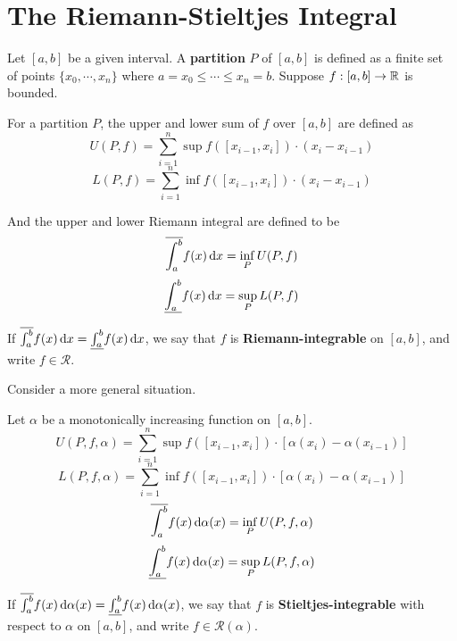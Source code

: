 \section{The Riemann-Stieltjes Integral}
    \begin{defi}
        Let $[a,b]$ be a given interval. A \textbf{partition} $P$ of $[a,b]$ is defined as a finite set of points $\{ x_0, \cdots, x_n \}$ where $a = x_0 \leq \cdots \leq x_n = b$. Suppose $f: [a,b] \to \mathbb{R}$ is bounded. 
        
        For a partition $P$, the upper and lower sum of $f$ over $[a,b]$ are defined as
        \begin{equation}
            U(P,f) = \sum_{i=1}^n \sup f([x_{i-1}, x_i]) \cdot (x_i - x_{i-1})
        \end{equation}
        \begin{equation}
            L(P,f) = \sum_{i=1}^n \inf f([x_{i-1}, x_i]) \cdot (x_i - x_{i-1})
        \end{equation}
        
    And the upper and lower Riemann integral are defined to be
    \begin{equation}
        \overline{\int_a^b} f(x) \mathop{}\!\mathrm{d} x = \inf_P U(P, f)
    \end{equation}
    \begin{equation}
        \underline{\int_a^b} f(x) \mathop{}\!\mathrm{d} x = \sup_P L(P, f)
    \end{equation}

    If $\overline{\int_a^b} f(x) \mathop{}\!\mathrm{d} x = \underline{\int_a^b} f(x) \mathop{}\!\mathrm{d} x$, we say that $f$ is \textbf{Riemann-integrable} on $[a,b]$, and write $f \in \mathscr{R}$.
    \end{defi}

    Consider a more general situation.
    \begin{defi}
        Let $\alpha$ be a monotonically increasing function on $[a,b]$.
        \begin{equation}
            U(P,f,\alpha) = \sum_{i=1}^n \sup f([x_{i-1}, x_i]) \cdot [\alpha(x_i) - \alpha(x_{i-1})]
        \end{equation}
        \begin{equation}
            L(P,f,\alpha) = \sum_{i=1}^n \inf f([x_{i-1}, x_i]) \cdot [\alpha(x_i) - \alpha(x_{i-1})]
        \end{equation}
        \begin{equation}
            \overline{\int_a^b} f(x) \mathop{}\!\mathrm{d} \alpha(x) = \inf_P U(P, f, \alpha)
        \end{equation}
        \begin{equation}
            \underline{\int_a^b} f(x) \mathop{}\!\mathrm{d} \alpha(x) = \sup_P L(P, f, \alpha)
        \end{equation}

        If $\overline{\int_a^b} f(x) \mathop{}\!\mathrm{d} \alpha(x) = \underline{\int_a^b} f(x) \mathop{}\!\mathrm{d} \alpha(x)$, we say that $f$ is \textbf{Stieltjes-integrable} with respect to $\alpha$ on $[a,b]$, and write $f \in \mathscr{R}(\alpha)$.
    \end{defi}

